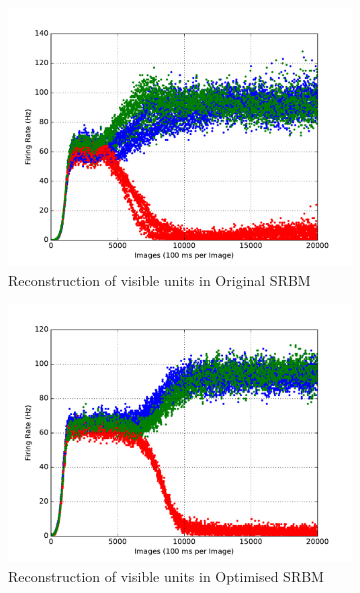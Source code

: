 \begin{figure}
\begin{subfigure}[t]{0.32\textwidth}
		\includegraphics[width=\textwidth]{pics_sdlm/10_exp_SRBM_Orig/exp3_recon_s_2.pdf}
		\caption{Reconstruction of visible units in Original SRBM}
	\end{subfigure}
	\begin{subfigure}[t]{0.32\textwidth}
		\includegraphics[width=\textwidth]{pics_sdlm/17_exp_SRBM_all_long/exp3_recon_s_2.pdf}
		\caption{Reconstruction of visible units in Optimised SRBM}
	\end{subfigure}\\
	\begin{subfigure}[t]{0.32\textwidth}

\end{subfigure}
\end{figure}

